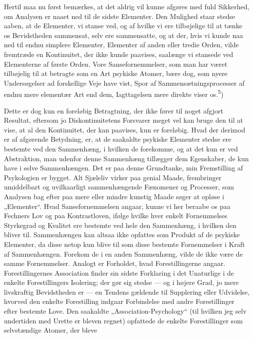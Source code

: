 \documentclass[12pt,a4paper,openany]{book}
\newcommand{\opage}[1]{\marginnote{\footnotesize\textit{[#1]}}}
\begin{document}
Hertil maa nu først bemærkes, at det aldrig vil kunne afgøres med fuld
Sikkerhed, om Analysen er naaet ned til de sidste Elementer. Den Mulighed staar
stedse aaben, at de Elementer, vi stanse ved, og af hvilke vi ere tilbøjelige
til at tænke os Bevidstheden sammensat, selv ere sammensatte, og at der, hvis
vi kunde naa ned til endnu simplere Elementer, Elementer af anden eller tredie
Orden, vilde fremtræde en Kontinuitet, der ikke kunde paavises, saalænge vi
stansede ved Elementerne af første Orden. Vore Sansefornemmelser, som man har
været tilbøjelig til at betragte som en Art psykiske Atomer, bære dog, som
nyere Undersøgelser ad forskellige Veje have vist, Spor af
Sammensætningsprocesser af endnu mere elementær Art end dem, Iagttagelsen mere
direkte viser os.\textsuperscript{5})

Dette er dog kun en foreløbig Betragtning, der ikke fører til noget afgjort
Resultat, eftersom jo Diskontinuitetens Forsvarer meget vel kan bruge den til
at vise, at al den Kontinuitet, der kan paavises, kun er foreløbig. Hvad der
derimod er af afgørende Betydning, er, at de saakaldte psykiske Elementer
stedse ere bestemte ved den Sammenhæng, i hvilken de forekomme, og at det kun
er ved Abstraktion, man udenfor denne Sammenhæng tillægger dem Egenskaber, de
kun have i selve Sammenhængen. Det er paa denne Grundtanke, min Fremstilling af
Psykologien er bygget. Alt Sjæleliv virker paa genial Maade, frembringer
umiddelbart og uvilkaarligt sammenhængende Fænomener og Processer, som Analysen
bag efter paa mere eller mindre kunstig Maade søger at opløse i „Elementer“.
Hvad Sansefornemmelsen angaar, kunne vi her beraabe os paa Fechners Lov og paa
Kontrastloven, ifølge hvilke hver enkelt Fornemmelses Styrkegrad og Kvalitet
ere bestemte ved hele
\opage{9}den Sammenhæng, i hvilken den bliver til. Sammenhængen kan altsaa ikke
opfattes som Produkt af de psykiske Elementer, da disse netop kun blive til som
disse bestemte Fornemmelser i Kraft af Sammenhængen. Forekom de i en anden
Sammenhæng, vilde de ikke være de samme Fornemmelser. Analogt er Forholdet,
hvad Forestillingerne angaar. Forestillingernes Association finder sin sidste
Forklaring i det Unaturlige i de enkelte Forestillingers Isolering; der gør sig
stedse --- og i højere Grad, jo mere livskraftig Bevidstheden er --- en Tendens
gældende til Supplering eller Udvidelse, hvorved den enkelte Forestilling
indgaar Forbindelse med andre Forestillinger efter bestemte Love. Den saakaldte
„Association-Psychology“ (til hvilken jeg selv undertiden med Urette er bleven
regnet) opfattede de enkelte Forestillinger som selvstændige Atomer, der bleve
\end{document}
